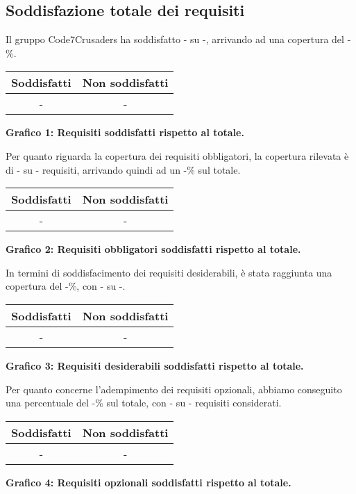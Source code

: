 \subsection{Soddisfazione totale dei requisiti}
Il gruppo Code7Crusaders ha soddisfatto - su -, arrivando ad una copertura del -\%.
\begin{center}
\begin{tabular}{|c|c|}
\hline
\textbf{Soddisfatti} & \textbf{Non soddisfatti} \\
\hline
- & - \\
\hline
\end{tabular}
\end{center}
\begin{center}
\textbf{Grafico 1: Requisiti soddisfatti rispetto al totale.}
\end{center}

Per quanto riguarda la copertura dei requisiti obbligatori, la copertura rilevata è di - su - requisiti, arrivando quindi ad un -\% sul totale.
\begin{center}
\begin{tabular}{|c|c|}
\hline
\textbf{Soddisfatti} & \textbf{Non soddisfatti} \\
\hline
- & - \\
\hline
\end{tabular}
\end{center}
\begin{center}
\textbf{Grafico 2: Requisiti obbligatori soddisfatti rispetto al totale.}
\end{center}

In termini di soddisfacimento dei requisiti desiderabili, è stata raggiunta una copertura del -\%, con - su -.
\begin{center}
\begin{tabular}{|c|c|}
\hline
\textbf{Soddisfatti} & \textbf{Non soddisfatti} \\
\hline
- & - \\
\hline
\end{tabular}
\end{center}
\begin{center}
\textbf{Grafico 3: Requisiti desiderabili soddisfatti rispetto al totale.}
\end{center}
Per quanto concerne l’adempimento dei requisiti opzionali, abbiamo conseguito una percentuale del -\% sul totale, con - su - requisiti considerati.
\begin{center}
    \begin{tabular}{|c|c|}
    \hline
    \textbf{Soddisfatti} & \textbf{Non soddisfatti} \\
    \hline
    - & - \\
    \hline
    \end{tabular}
    \end{center}
    \begin{center}
    \textbf{Grafico 4: Requisiti opzionali soddisfatti rispetto al totale.}
    \end{center}